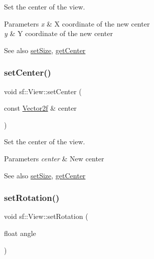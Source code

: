 Set the center of the view. 


\begin{DoxyParams}{Parameters}
{\em x} & X coordinate of the new center \\
\hline
{\em y} & Y coordinate of the new center\\
\hline
\end{DoxyParams}
\begin{DoxySeeAlso}{See also}
\hyperlink{classsf_1_1_view_a9525b73fe9fbaceb9568faf56b399dab}{set\+Size}, \hyperlink{classsf_1_1_view_a7f4443c194c691ae4dcf8fd9dd0eaa46}{get\+Center} 
\end{DoxySeeAlso}
\mbox{\label{classsf_1_1_view_ab0296b03793e0873e6ae9e15311f3e78}} 
\subsubsection{\texorpdfstring{set\+Center()}{setCenter()}\hspace{0.1cm}{\footnotesize\ttfamily [2/2]}}
{\footnotesize\ttfamily void sf\+::\+View\+::set\+Center (\begin{DoxyParamCaption}\item[{const \hyperlink{classsf_1_1_vector2}{Vector2f} \&}]{center }\end{DoxyParamCaption})}



Set the center of the view. 


\begin{DoxyParams}{Parameters}
{\em center} & New center\\
\hline
\end{DoxyParams}
\begin{DoxySeeAlso}{See also}
\hyperlink{classsf_1_1_view_a9525b73fe9fbaceb9568faf56b399dab}{set\+Size}, \hyperlink{classsf_1_1_view_a7f4443c194c691ae4dcf8fd9dd0eaa46}{get\+Center} 
\end{DoxySeeAlso}
\mbox{\label{classsf_1_1_view_a24d0503c9c51f5ef5918612786d325c1}} 
\subsubsection{\texorpdfstring{set\+Rotation()}{setRotation()}}
{\footnotesize\ttfamily void sf\+::\+View\+::set\+Rotation (\begin{DoxyParamCaption}\item[{float}]{angle }\end{DoxyParamCaption})}



